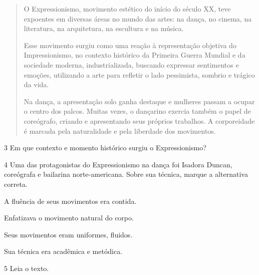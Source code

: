 \begin{quote}
O Expressionismo, movimento estético do início do século XX, teve
expoentes em diversas áreas no mundo das artes: na dança, no cinema, na
literatura, na arquitetura, na escultura e na música.

Esse movimento surgiu como uma reação à representação objetiva do
Impressionismo, no contexto histórico da Primeira Guerra Mundial e da
sociedade moderna, industrializada, buscando expressar sentimentos e
emoções, utilizando a arte para refletir o lado pessimista, sombrio e
trágico da vida.

Na dança, a apresentação solo ganha destaque e mulheres passam a ocupar
o centro dos palcos. Muitas vezes, o dançarino exercia também o papel de
coreógrafo, criando e apresentando seus próprios trabalhos. A
corporeidade é marcada pela naturalidade e pela liberdade dos movimentos.

\end{quote}

\num{3} Em que contexto e momento histórico surgiu o Expressionismo?


\num{4} Uma das protagonistas do Expressionismo na dança foi Isadora Duncan,
coreógrafa e bailarina norte-americana. Sobre sua técnica, marque a
alternativa correta.

\begin{boxlist}
\item A fluência de seus movimentos era contida.

\item Enfatizava o movimento natural do corpo. 

\item Seus movimentos eram uniformes, fluidos.

\item Sua técnica era acadêmica e metódica.
\end{boxlist}

\num{5} Leia o texto.


